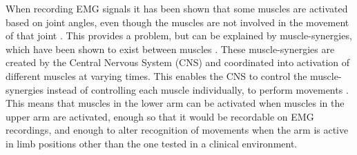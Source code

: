 When recording EMG signals it has been shown that some muscles are activated based on joint angles, even though the muscles are not involved in the movement of that joint \cite{Fougner2011}. This provides a problem, but can be explained by muscle-synergies, which have been shown to exist between muscles \cite{DeRugy2013}. These muscle-synergies are created by the Central Nervous System (CNS) and coordinated into activation of different muscles at varying times. This enables the CNS to control the muscle-synergies instead of controlling each muscle individually, to perform movements \cite{jiang2009}. This means that muscles in the lower arm can be activated when muscles in the upper arm are activated, enough so that it would be recordable on EMG recordings, and enough to alter recognition of movements when the arm is active in limb positions other than the one tested in a clinical environment. 

